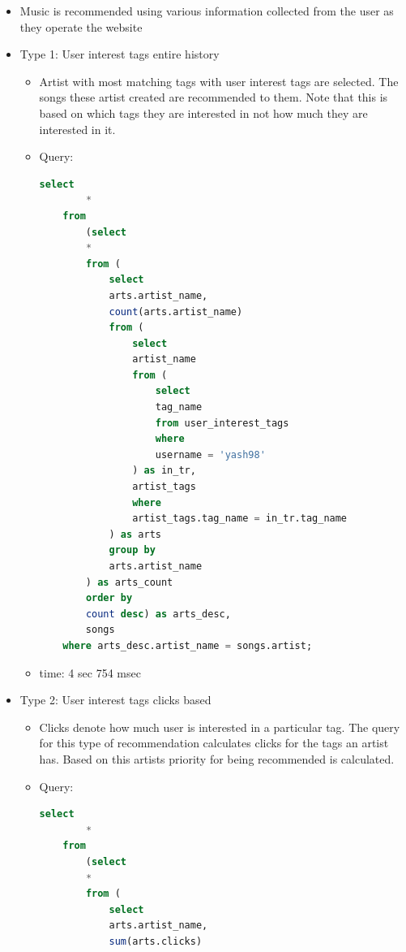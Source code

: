 \documentclass[10pt]{article}
\begin{document}
\begin{itemize}
    \begin{itemize}
        \item Music is recommended using various information collected from the user as they operate the website 
        \item Type 1: User interest tags entire history
        \begin{itemize}
            \item Artist with most matching tags with user interest tags are selected. The songs these artist created are recommended to them. Note that this is based on which tags they are interested in not how much they are interested in it.
            \item Query: 
            \begin{lstlisting}[language=SQL,
                deletekeywords={IDENTITY,INT},
                morekeywords={clustered},    
                framesep=10pt,
                framextopmargin=10pt]
        select 
    	*
    from
    	(select
    	*
    	from (
    		select
    		arts.artist_name,
    		count(arts.artist_name)
    		from (
    			select
    			artist_name
    			from (
    				select
    				tag_name
    				from user_interest_tags
    				where
    				username = 'yash98'
    			) as in_tr,
    			artist_tags
    			where
    			artist_tags.tag_name = in_tr.tag_name
    		) as arts
    		group by
    		arts.artist_name
    	) as arts_count
    	order by
    	count desc) as arts_desc,
    	songs
    where arts_desc.artist_name = songs.artist;
            \end{lstlisting}
        \item time: 4 sec 754 msec
        \end{itemize}
        \item Type 2: User interest tags clicks based
        \begin{itemize}
            \item Clicks denote how much user is interested in a particular tag. The query for this type of recommendation calculates clicks for the tags an artist has. Based on this artists priority for being recommended is calculated.
            \item Query: 
            \begin{lstlisting}[language=SQL,
                deletekeywords={IDENTITY,INT},
                morekeywords={clustered},    
                framesep=10pt,
                framextopmargin=10pt]
    select 
    	*
    from
    	(select
    	*
    	from (
    		select
    		arts.artist_name,
    		sum(arts.clicks)

\end{lstlisting}
\end{itemize}
\end{itemize}
\end{itemize}
\end{document}

